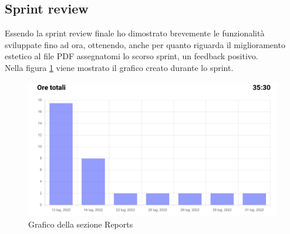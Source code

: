 \subsection{Sprint review}
Essendo la sprint review finale ho dimostrato brevemente le funzionalità sviluppate fino ad ora, ottenendo, anche per quanto riguarda il miglioramento estetico al file PDF assegnatomi lo scorso sprint, un feedback positivo.\\
Nella figura \ref{fig:report_chart} viene mostrato il grafico creato durante lo sprint.
\begin{figure}[H]
	\includegraphics[width = \textwidth]{immagini/reports chart.png}
	\caption{Grafico della sezione Reports}
	\label{fig:report_chart}
\end{figure}